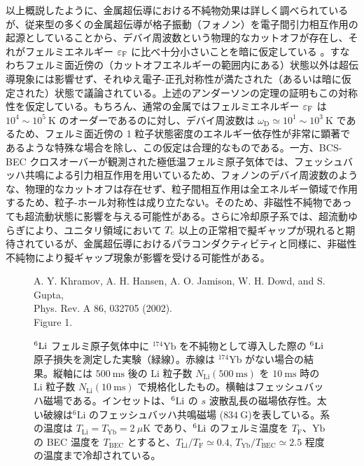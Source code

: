 以上概説したように、金属超伝導における不純物効果は詳しく調べられているが、従来型の多くの金属超伝導が格子振動（フォノン）を電子間引力相互作用の起源としていることから、デバイ周波数という物理的なカットオフが存在し、それがフェルミエネルギー $\varepsilon_{\text{F}}$ に比べ十分小さいことを暗に仮定している \cite{maki1968}。すなわちフェルミ面近傍の（カットオフエネルギーの範囲内にある）状態以外は超伝導現象には影響せず、それゆえ電子-正孔対称性が満たされた（あるいは暗に仮定された）状態で議論されている。上述のアンダーソンの定理の証明もこの対称性を仮定している。もちろん、通常の金属ではフェルミエネルギー $\varepsilon_{\text{F}}$ は $10^{4} \sim 10^{5}\ \mathrm{K}$ のオーダーであるのに対し、デバイ周波数は $\omega_{\text{D}} \simeq 10^{1}\sim 10^{3}\ \mathrm{K}$ であるため、フェルミ面近傍の 1 粒子状態密度のエネルギー依存性が非常に顕著であるような特殊な場合を除し、この仮定は合理的なものである。一方、BCS-BEC クロスオーバーが観測された極低温フェルミ原子気体では、フェッシュバッハ共鳴による引力相互作用を用いているため、フォノンのデバイ周波数のような、物理的なカットオフは存在せず、粒子間相互作用は全エネルギー領域で作用するため、粒子-ホール対称性は成り立たない。そのため、非磁性不純物であっても超流動状態に影響を与える可能性がある。さらに冷却原子系では、超流動ゆらぎにより、ユニタリ領域において $T_{\text{c}}$ 以上の正常相で擬ギャップが現れると期待されているが、金属超伝導におけるパラコンダクティビティと同様に、非磁性不純物により擬ギャップ現象が影響を受ける可能性がある。


\begin{figure}[t]
\centering
\vspace{22mm}
A. Y. Khramov, A. H. Hansen, A. O. Jamison, W. H. Dowd, and S. Gupta,\\
 Phys. Rev. A 86, 032705 (2002).\\
Figure 1.
\vspace{22mm}
\caption{${}^6\mathrm{Li}$ フェルミ原子気体中に ${}^{174}\mathrm{Yb}$ を不純物として導入した際の ${}^6\mathrm{Li}$ 原子損失を測定した実験（緑線）\cite{kharamov2012}。赤線は ${}^{174}\mathrm{Yb}$ がない場合の結果。縦軸には $500\ \mathrm{ms}$ 後の $\mathrm{Li}$ 粒子数 $N_{\mathrm{Li}}(500\ \mathrm{ms})$ を $10\ \mathrm{ms}$ 時の $\mathrm{Li}$ 粒子数 $N_{\mathrm{Li}}(10\ \mathrm{ms})$ で規格化したもの。横軸はフェッシュバッハ磁場である。インセットは、${}^6\mathrm{Li}$ の $s$ 波散乱長の磁場依存性。太い破線は${}^{6}\mathrm{Li}$ のフェッシュバッハ共鳴磁場 ($834\ \mathrm{G}$)を表している。系の温度は $T_{\text{Li}}=T_{\text{Yb}}=2\ \mu \mathrm{K}$ であり、${}^6\mathrm{Li}$ のフェルミ温度を $T_{\text{F}}$、$\text{Yb}$ の BEC 温度を $T_{\text{BEC}}$ とすると、$T_{\text{Li}}/T_{\text{F}} \simeq 0.4$, $T_{\text{Yb}}/T_{\text{BEC}}\simeq 2.5$ 程度の温度まで冷却されている。}
\label{fig:imp-mixture}
\end{figure}

